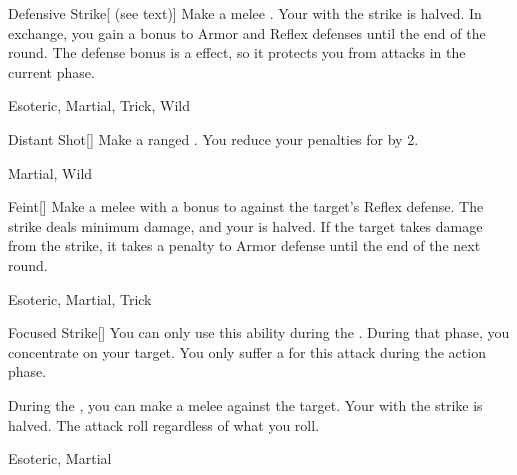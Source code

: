 \lowercase{\hypertarget{maneuver:Defensive Strike}{}}\label{maneuver:Defensive Strike}
\hypertarget{maneuver:Defensive Strike}{}
\begin{freeability}[Rank 2]{Defensive Strike}[ (see text)]
Make a melee .
Your  with the strike is halved.
In exchange, you gain a  bonus to Armor and Reflex defenses until the end of the round.
The defense bonus is a  effect, so it protects you from attacks in the current phase.


 Esoteric, Martial, Trick, Wild
\end{freeability}
\vspace{0.25em}



\lowercase{\hypertarget{maneuver:Distant Shot}{}}\label{maneuver:Distant Shot}
\hypertarget{maneuver:Distant Shot}{}
\begin{freeability}[Rank 2]{Distant Shot}[]
Make a ranged .
You reduce your penalties for  by 2.


 Martial, Wild
\end{freeability}
\vspace{0.25em}



\lowercase{\hypertarget{maneuver:Feint}{}}\label{maneuver:Feint}
\hypertarget{maneuver:Feint}{}
\begin{freeability}[Rank 2]{Feint}[]
Make a melee  with a  bonus to  against the target's Reflex defense.
The strike deals minimum damage, and your  is halved.
If the target takes damage from the strike, it takes a  penalty to Armor defense until the end of the next round.


 Esoteric, Martial, Trick
\end{freeability}
\vspace{0.25em}



\lowercase{\hypertarget{maneuver:Focused Strike}{}}\label{maneuver:Focused Strike}
\hypertarget{maneuver:Focused Strike}{}
\begin{freeability}[Rank 2]{Focused Strike}[]
You can only use this ability during the .
During that phase, you concentrate on your target.
You only suffer a  for this attack during the action phase.

During the , you can make a melee  against the target.
Your  with the strike is halved.
The attack roll  regardless of what you roll.


 Esoteric, Martial
\end{freeability}
\vspace{0.25em}



